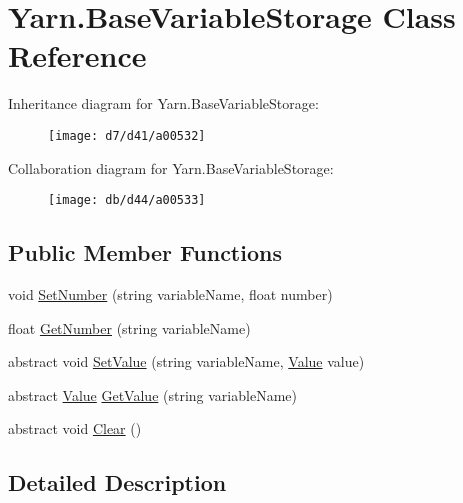 \hypertarget{a00021}{\section{Yarn.\-Base\-Variable\-Storage Class Reference}
\label{a00021}
}


Inheritance diagram for Yarn.\-Base\-Variable\-Storage\-:
\nopagebreak
\begin{figure}[H]
\begin{center}
\leavevmode
\texttt{[image: d7/d41/a00532]}
\end{center}
\end{figure}


Collaboration diagram for Yarn.\-Base\-Variable\-Storage\-:
\nopagebreak
\begin{figure}[H]
\begin{center}
\leavevmode
\texttt{[image: db/d44/a00533]}
\end{center}
\end{figure}
\subsection*{Public Member Functions}
\begin{DoxyCompactItemize}
\item 
void \hyperlink{a00021_a48b93de9cd7ae61d0cd9583c8330d3ee}{Set\-Number} (string variable\-Name, float number)
\item 
float \hyperlink{a00021_a1b7f7f4468b2463e7b47986d99362279}{Get\-Number} (string variable\-Name)
\item 
abstract void \hyperlink{a00021_a1c57d6d208b78abec0a670396771448e}{Set\-Value} (string variable\-Name, \hyperlink{a00161}{Value} value)
\item 
abstract \hyperlink{a00161}{Value} \hyperlink{a00021_a13b142df804d9842e97e628e252928e8}{Get\-Value} (string variable\-Name)
\item 
abstract void \hyperlink{a00021_a7e45c37f3662ce9f2643e306bb2b3adc}{Clear} ()
\end{DoxyCompactItemize}


\subsection{Detailed Description}


